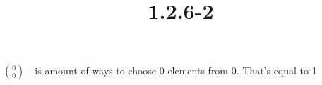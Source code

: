 \documentclass{article}
\title{1.2.6-2}
\begin{document}
\maketitle

$\binom{0}{0}$ - is amount of ways to choose 0 elements from 0. That's equal to 1
\end{document}
